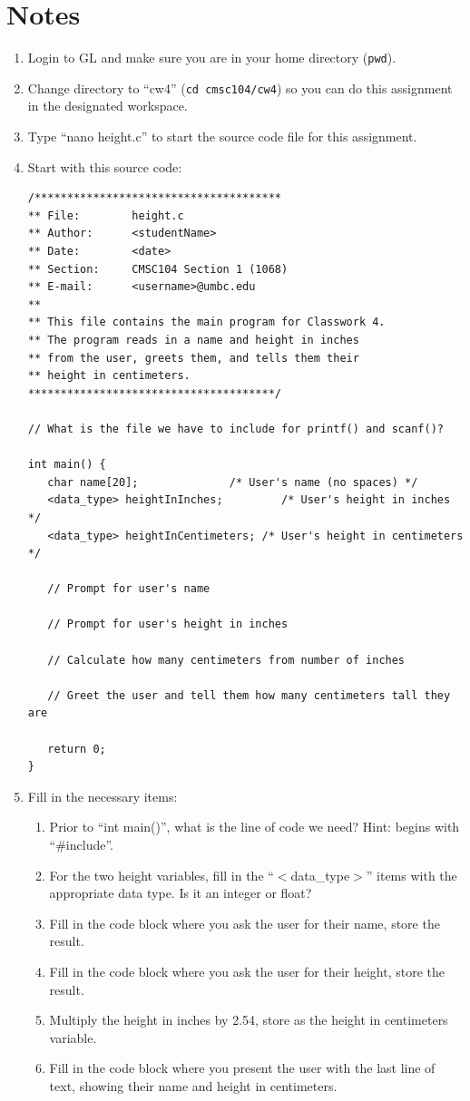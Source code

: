 \documentclass[letter,11pt]{article}
\begin{document}
\section*{Notes}
\begin{enumerate}
    \item Login to GL and make sure you are in your home directory (\texttt{pwd}).
    \item Change directory to ``cw4'' (\texttt{cd cmsc104/cw4}) so you can do this assignment in the designated workspace.
    \item Type ``nano height.c'' to start the source code file for this assignment.
    \item Start with this source code: 
    \begin{verbatim}
/**************************************
** File:        height.c
** Author:      <studentName>
** Date:        <date>
** Section:     CMSC104 Section 1 (1068)
** E-mail:      <username>@umbc.edu
**
** This file contains the main program for Classwork 4.
** The program reads in a name and height in inches
** from the user, greets them, and tells them their
** height in centimeters.
**************************************/

// What is the file we have to include for printf() and scanf()?

int main() {
   char name[20];              /* User's name (no spaces) */
   <data_type> heightInInches;         /* User's height in inches */
   <data_type> heightInCentimeters; /* User's height in centimeters */

   // Prompt for user's name

   // Prompt for user's height in inches

   // Calculate how many centimeters from number of inches

   // Greet the user and tell them how many centimeters tall they are

   return 0;
}
    \end{verbatim}
    \item Fill in the necessary items:
    \begin{enumerate}
        \item Prior to ``int main()'', what is the line of code we need? Hint: begins with ``\#include''.
        \item For the two height variables, fill in the ``$<$data\_type$>$'' items with the appropriate data type. Is it an integer or float?
        \item Fill in the code block where you ask the user for their name, store the result.
        \item Fill in the code block where you ask the user for their height, store the result.
        \item Multiply the height in inches by 2.54, store as the height in centimeters variable.
        \item Fill in the code block where you present the user with the last line of text, showing their name and height in centimeters.
    \end{enumerate}
\end{enumerate}
\end{document}
